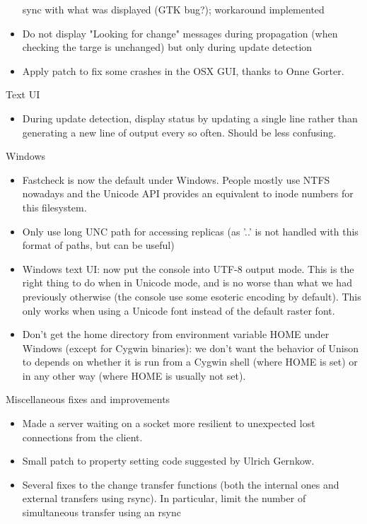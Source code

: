 \begin{changesfromversion}{2.32}
\begin{itemize}
    sync with what was displayed (GTK bug?); workaround implemented
\item Do not display "Looking for change" messages during propagation
  (when checking the targe is unchanged) but only during update detection
\item Apply patch to fix some crashes in the OSX GUI, thanks to Onne Gorter.
\end{itemize}
\item Text UI
\begin{itemize}
\item During update detection, display status by updating a single line
rather than generating a new line of output every so often.  Should be less
confusing.
\end{itemize}
\item Windows
\begin{itemize}
\item Fastcheck is now the default under Windows.  People mostly use NTFS
  nowadays and the Unicode API provides an equivalent to inode numbers
  for this filesystem.
\item Only use long UNC path for accessing replicas (as '..' is
  not handled with this format of paths, but can be useful)
\item Windows text UI: now put the console into UTF-8 output mode.  This
  is the right thing to do when in Unicode mode, and is no worse than
  what we had previously otherwise (the console use some esoteric
  encoding by default).  This only works when using a Unicode font
  instead of the default raster font.
\item Don't get the home directory from environment variable HOME under
  Windows (except for Cygwin binaries): we don't want the behavior of
  Unison to depends on whether it is run from a Cygwin shell (where
  HOME is set) or in any other way (where HOME is usually not set).
\end{itemize}
\item Miscellaneous fixes and improvements
\begin{itemize}
\item Made a server waiting on a socket more resilient to unexpected
  lost connections from the client.
\item Small patch to property setting code suggested by Ulrich Gernkow.
\item Several fixes to the change transfer functions (both the internal ones
  and external transfers using rsync).  In particular, limit the number of
  simultaneous transfer using an rsync

\end{itemize}
\end{changesfromversion}

